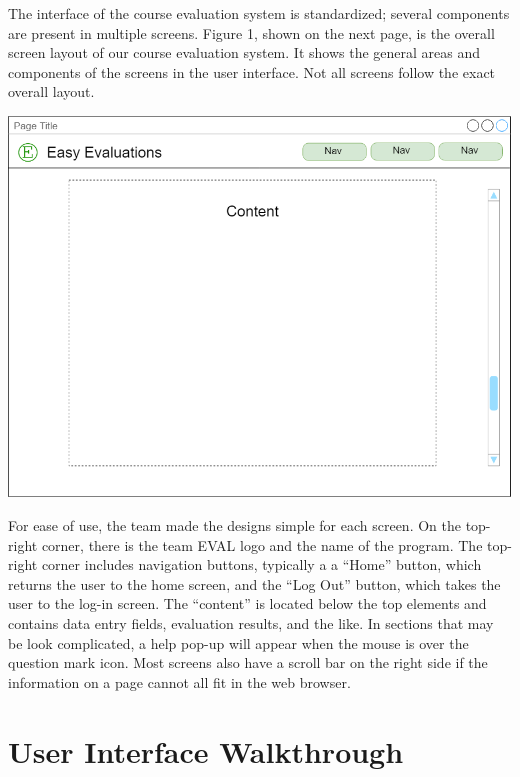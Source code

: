 \documentclass{article}
\begin{document}
The interface of the course evaluation system is standardized; several components are present in multiple screens. Figure 1, shown on the next page, is the overall screen layout of our course evaluation system. It shows the general areas and components of the screens in the user interface. Not all screens follow the exact overall layout.

\newpage

\begin{center}
\vspace{3mm}
{\includegraphics[width=6.5in]{images/overall_layout.png}}
\vspace{2mm}
\end{center}

For ease of use, the team made the designs simple for each screen. On the top-right corner, there is the team EVAL logo and the name of the program. The top-right corner includes navigation buttons, typically a a ``Home'' button, which returns the user to the home screen, and the ``Log Out'' button, which takes the user to the log-in screen. The ``content'' is located below the top elements and contains data entry fields, evaluation results, and the like. In sections that may be look complicated, a help pop-up will appear when the mouse is over the question mark icon. Most screens also have a scroll bar on the right side if the information on a page cannot all fit in the web browser.

\newpage

\section{User Interface Walkthrough}
\end{document}
